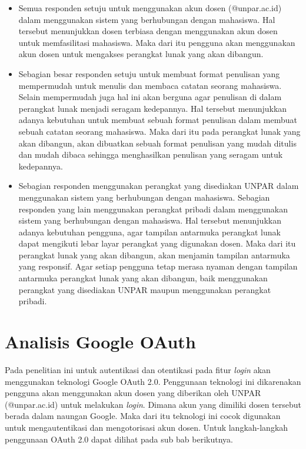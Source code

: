\begin{itemize}
\item Semua responden setuju untuk menggunakan akun dosen (@unpar.ac.id) dalam menggunakan sistem yang berhubungan dengan mahasiswa. Hal tersebut menunjukkan dosen terbiasa dengan menggunakan akun dosen untuk memfasilitasi mahasiswa. Maka dari itu pengguna akan menggunakan akun dosen untuk mengakses perangkat lunak yang akan dibangun.
\item Sebagian besar responden setuju untuk membuat format penulisan yang mempermudah untuk menulis dan membaca catatan seorang mahasiswa. Selain mempermudah juga hal ini akan berguna agar penulisan di dalam perangkat lunak menjadi seragam kedepannya. Hal tersebut menunjukkan adanya kebutuhan untuk membuat sebuah format penulisan dalam membuat sebuah catatan seorang mahasiswa. Maka dari itu pada perangkat lunak yang akan dibangun, akan dibuatkan sebuah format penulisan yang mudah ditulis dan mudah dibaca sehingga menghasilkan penulisan yang seragam untuk kedepannya.
\item Sebagian responden menggunakan perangkat yang disediakan UNPAR dalam menggunakan sistem yang berhubungan dengan mahasiswa. Sebagian responden yang lain menggunakan perangkat pribadi dalam menggunakan sistem yang berhubungan dengan mahasiswa. Hal tersebut menunjukkan adanya kebutuhan pengguna, agar tampilan antarmuka perangkat lunak dapat mengikuti lebar layar perangkat yang digunakan dosen. Maka dari itu perangkat lunak yang akan dibangun, akan menjamin tampilan antarmuka yang responsif. Agar setiap pengguna tetap merasa nyaman dengan tampilan antarmuka perangkat lunak yang akan dibangun, baik menggunakan perangkat yang disediakan UNPAR maupun menggunakan perangkat pribadi.
\end{itemize}

\section{Analisis Google OAuth}
\label{sec:analisisGoogleOAuth}

Pada penelitian ini untuk autentikasi dan otentikasi pada fitur {\it login} akan menggunakan teknologi Google OAuth 2.0. Penggunaan teknologi ini dikarenakan pengguna akan menggunakan akun dosen yang diberikan oleh UNPAR (@unpar.ac.id) untuk melakukan {\it login}. Dimana akun yang dimiliki dosen tersebut berada dalam naungan Google. Maka dari itu teknologi ini cocok digunakan untuk mengautentikasi dan mengotorisasi akun dosen. Untuk langkah-langkah penggunaan OAuth 2.0 dapat dilihat pada sub bab berikutnya.


